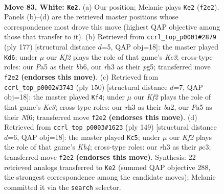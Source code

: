 \documentclass[11pt]{article}
\begin{document}
\clearpage

\begin{figure}[p]\centering
\begin{subfigure}{0.46\textwidth}\centering
\resizebox{\linewidth}{!}{%
\newchessgame
\chessboard[
  setfen={8/2n3R1/3k4/P7/8/7r/5K2/8 w - - 13 83},
  showmover=false,
  pgfstyle=straightmove, color=movearrow, markmove={f2-e2}
]}
\caption{}
\end{subfigure}\hfill
\begin{subfigure}{0.46\textwidth}\centering
\resizebox{\linewidth}{!}{%
\newchessgame
\chessboard[
  setfen={8/8/1B2k3/6P1/2r4N/6K1/8/8 b - - 8 89},
  showmover=false,
  pgfstyle=straightmove, color=movearrow, markmove={e6-d6}
]}
\caption{}
\end{subfigure}
\\[4pt]
\begin{subfigure}{0.46\textwidth}\centering
\resizebox{\linewidth}{!}{%
\newchessgame
\chessboard[
  setfen={8/8/2kn1N2/8/8/4K3/b7/3R4 w - - 13 76},
  showmover=false,
  pgfstyle=straightmove, color=movearrow, markmove={e3-f4}
]}
\caption{}
\end{subfigure}\hfill
\begin{subfigure}{0.46\textwidth}\centering
\resizebox{\linewidth}{!}{%
\newchessgame
\chessboard[
  setfen={8/8/8/1k1p4/8/2P5/1N4r1/2K5 b - - 59 75},
  showmover=false,
  pgfstyle=straightmove, color=movearrow, markmove={b5-c5}
]}
\caption{}
\end{subfigure}
\caption{\textbf{Move 83, White: \texttt{Ke2}.} (a) Our position; Melanie plays \texttt{Ke2} (\texttt{f2e2}). Panels (b)--(d) are the retrieved master positions whose correspondence most drove this move (highest QAP objective among those that transfer to it). (b) Retrieved from \texttt{ccrl\_top\_p0001\#2879} (ply 177) [structural distance $d$=5, QAP obj=18]: the master played \texttt{Kd6}; under $\mu$ our \emph{Kf2} plays the role of that game's \emph{Ke3}; cross-type roles: our \emph{P}a5 as their \emph{b}b6, our \emph{r}h3 as their \emph{p}g5; transferred move \texttt{f2e2} \textbf{(endorses this move)}. (c) Retrieved from \texttt{ccrl\_top\_p0002\#3743} (ply 150) [structural distance $d$=7, QAP obj=18]: the master played \texttt{Kf4}; under $\mu$ our \emph{Kf2} plays the role of that game's \emph{Ke3}; cross-type roles: our \emph{r}h3 as their \emph{b}a2, our \emph{P}a5 as their \emph{N}f6; transferred move \texttt{f2e2} \textbf{(endorses this move)}. (d) Retrieved from \texttt{ccrl\_top\_p0003\#1623} (ply 149) [structural distance $d$=6, QAP obj=18]: the master played \texttt{Kc5}; under $\mu$ our \emph{Kf2} plays the role of that game's \emph{Kb4}; cross-type roles: our \emph{r}h3 as their \emph{p}c3; transferred move \texttt{f2e2} \textbf{(endorses this move)}. Synthesis: 22 retrieved analogs transferred to \texttt{Ke2} (summed QAP objective 288, the strongest correspondence among the candidate moves); Melanie committed it via the \texttt{search} selector.}
\label{fig:thought-m164}
\end{figure}
\end{document}
